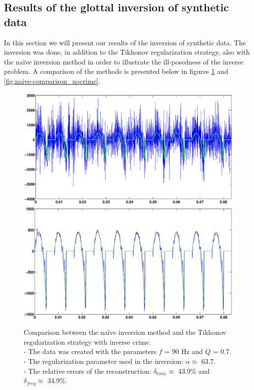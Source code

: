 \documentclass[12pt,a4]{article}
\newcommand{\inversionresult}[5]{\\
 - The data was created with the parameters $f$ = #1 Hz and $Q$ = #2.\\
 - The regularization parameter used in the inversion: $\alpha \approx$ #3.\\
 - The relative errors of the reconstruction: $\delta_{time} \approx$ #4\% and $\delta_{freq} \approx$ #5\%.}
\begin{document}
\subsection{Results of the glottal inversion of synthetic data}
In this section we will present our results of the inversion of synthetic data. The inversion was done, in addition to the Tikhonov regularization strategy, also with the naïve inversion method in order to illustrate the ill-posedness of the inverse problem.
A comparison of the methods is presented below in figures \ref{fig:naive-comparison_crime} and \ref{fig:naive-comparison_nocrime}.
\begin{figure}[H]
\begin{center}
\includegraphics[scale=.3]{img/naive_test_naive.eps}
\includegraphics[scale=.3]{img/naive_test_morozov.eps}
\end{center}
\caption{Comparison between the naïve inversion method and the Tikhonov regularization strategy with inverse crime. \inversionresult{90}{0.7}{63.7}{43.9}{34.9}}
\label{fig:naive-comparison_crime}
\end{figure}
\end{document}
